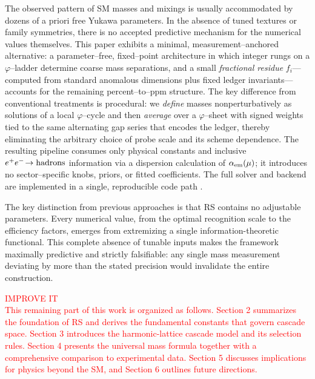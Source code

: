 \documentclass[%
 amsmath,amssymb,
 aps,
prb,
floatfix, showkeys
]{revtex4-2}
\newcommand{\need}[1]{\textcolor{red}{#1}}
\begin{document}
The observed pattern of SM masses and mixings is usually accommodated by dozens of a priori free Yukawa parameters. In the absence of tuned textures or family symmetries, there is no accepted predictive mechanism for the numerical values themselves.
This paper exhibits a minimal, measurement--anchored alternative: a parameter--free, fixed--point architecture in which integer rungs on a $\varphi$--ladder determine coarse mass separations, and a small \emph{fractional residue} $f_i$—computed from standard anomalous dimensions plus fixed ledger invariants—accounts for the remaining percent--to--ppm structure. The key difference from conventional treatments is procedural: we \emph{define} masses nonperturbatively as solutions of a local $\varphi$--cycle and then \emph{average} over a $\varphi$--sheet with signed weights tied to the same alternating gap series that encodes the ledger, thereby eliminating the arbitrary choice of probe scale and its scheme dependence. The resulting pipeline consumes only physical constants and inclusive $e^+e^-\!\to{\rm hadrons}$ information via a dispersion calculation of $\alpha_{\rm em}(\mu)$; it introduces no sector--specific knobs, priors, or fitted coefficients. The full solver and backend are implemented in a single, reproducible code path \cite{EidelmanJegerlehner1995,Jegerlehner2003,Keshavarzi2019,Davier2017,PDG2024}.


The key distinction from previous approaches is that RS contains no adjustable
parameters. Every numerical value, from the optimal recognition scale
to the efficiency factors, emerges from extremizing a single information-theoretic
functional. This complete absence of tunable inputs makes the framework maximally
predictive and strictly falsifiable: any single mass measurement deviating by more
than the stated precision would invalidate the entire construction.


{\need{ IMPROVE IT \\
    This remaining part of this work is organized as follows.
 Section 2 summarizes the foundation of RS and derives the
 fundamental constants that govern cascade space.
 Section 3 introduces the harmonic-lattice cascade model and its selection rules.
 Section 4 presents the universal mass formula together with a comprehensive
 comparison to experimental data.
 Section 5 discusses implications for physics beyond the SM,
 and Section 6 outlines future directions.
}}


\end{document}
